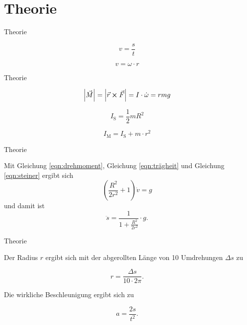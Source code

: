 \section{Theorie}
\begin{frame}{Theorie}
    
    \begin{equation*}
        v= \frac{s}{t}
    \end{equation*}
    
    \begin{equation*}
        v = \omega \cdot r
    \end{equation*}

\end{frame}
\begin{frame}{Theorie}

    \begin{equation}
        \abs{\vec{M}} = \abs{ \vec{r} \cross \vec{F} } = I \cdot \dot{\omega} = r m g
        \label{eqn:drehmoment}
    \end{equation}

    \begin{equation}
        I_\text{S}= \frac{1}{2} m R^2 
        \label{eqn:trägheit}
    \end{equation}

    \begin{equation}
        I_\text{M} = I_\text{S}+ m \cdot r^2
        \label{eqn:steiner}
    \end{equation}


\end{frame}
\begin{frame}{Theorie}


    Mit Gleichung \eqref{eqn:drehmoment}, Gleichung \eqref{eqn:trägheit} und Gleichung \eqref{eqn:steiner} ergibt sich
    \begin{equation*}
        (\frac{R^2}{2 r^2} +1) \dot{v} = g
    \end{equation*}
   und damit ist  
    \begin{equation*}
        \ddot{s} = \frac{1}{1 + \frac{R^2}{2r^2}} \cdot g.
    \end{equation*}


\end{frame}
\begin{frame}{Theorie}

    Der Radius $r$ ergibt sich mit der abgerollten Länge von 10 Umdrehungen $\Delta s$ zu

    \begin{equation*}
        r = \frac{\Delta s}{10 \cdot 2\pi}.
    \end{equation*}

    Die wirkliche Beschleunigung ergibt sich zu 
    
    \begin{equation*}
        a = \frac{2s}{t^2}.
    \end{equation*}

\end{frame}

